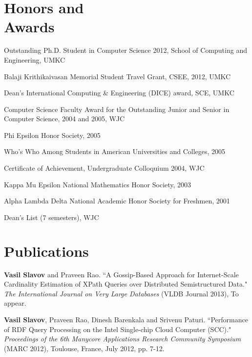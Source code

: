 \documentclass[margin,line]{resume}
\begin{document}
\begin{resume}
    \section{\mysidestyle Honors and\\Awards} 
    \begin{list2}
    \item Outstanding Ph.D. Student in Computer Science 2012, School of Computing and Engineering, UMKC
    \item Balaji Krithikaivasan Memorial Student Travel Grant, CSEE, 2012, UMKC
    \item Dean's International Computing \& Engineering (DICE) award, SCE, UMKC
    \item Computer Science Faculty Award for the Outstanding Junior and Senior in Computer Science, 2004 and 2005, WJC
    \item Phi Epsilon Honor Society, 2005
    \item Who's Who Among Students in American Universities and Colleges, 2005
    \item Certificate of Achievement, Undergraduate Colloquium 2004, WJC
    \item Kappa Mu Epsilon National Mathematics Honor Society, 2003
    \item Alpha Lambda Delta National Academic Honor Society for Freshmen, 2001
    \item Dean's List (7 semesters), WJC
    \end{list2}

    \section{\mysidestyle Publications}

    \textbf{Vasil Slavov} and Praveen Rao.
    ``A Gossip-Based Approach for Internet-Scale Cardinality Estimation of XPath Queries over Distributed Semistructured Data."
    \textsl{The International Journal on Very Large Databases} (VLDB Journal 2013), To appear.

\vspace{-2mm}
    \textbf{Vasil Slavov}, Praveen Rao, Dinesh Barenkala and Srivenu Paturi.
    ``Performance of RDF Query Processing on the Intel Single-chip Cloud Computer (SCC)."
    \textsl{Proceedings of the 6th Manycore Applications Research Community Symposium} (MARC 2012), Toulouse, France, July 2012, pp. 7-12.
    

\end{resume}
\end{document}

